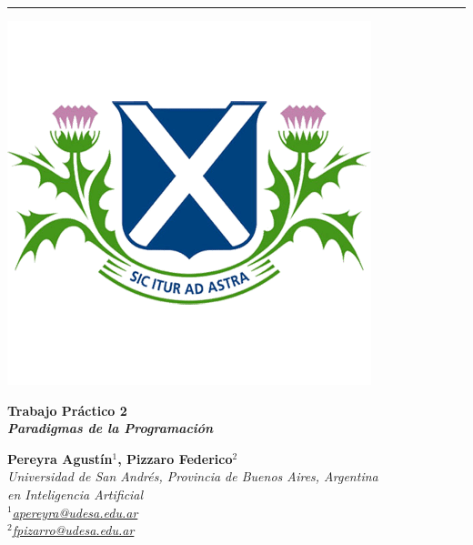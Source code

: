 \documentclass[11pt, a4paper]{article}
\begin{document}
\vspace*{1cm} 

{\noindent\rule{\textwidth}{0.5pt}}
\noindent
\begin{minipage}{0.24\textwidth}
    \includegraphics[width=\linewidth]{figures/logo2.png}
\end{minipage}
\hspace{0.02\textwidth}
\begin{minipage}{0.7\textwidth}
    {\fontsize{32}{36}\selectfont\bfseries\color{udesaBlue}\selectfont Trabajo Práctico 2}\\
    {\fontsize{20}{24}\selectfont\bfseries\itshape\color{udesaGreen}\selectfont Paradigmas de la Programación}
\end{minipage}

\begin{minipage}{0.8\textwidth}
    {\large\textbf{\color{udesaBlue} Pereyra Agustín$^{1}$, \color{udesaGreen}Pizzaro Federico$^{2}$}}\\
    {\itshape\small
    Universidad de San Andrés, Provincia de Buenos Aires, Argentina\\
    { en {\color{udesaGreen}Inteligencia Artificial}}\\
    \scriptsize {$^1$\href{mailto:apereyra@udesa.edu.ar}{apereyra@udesa.edu.ar}\\
    $^2$\href{mailto:fpizarro@udesa.edu.ar}{fpizarro@udesa.edu.ar}}
}
\end{minipage}
\vspace{0.5cm}
\end{document}
